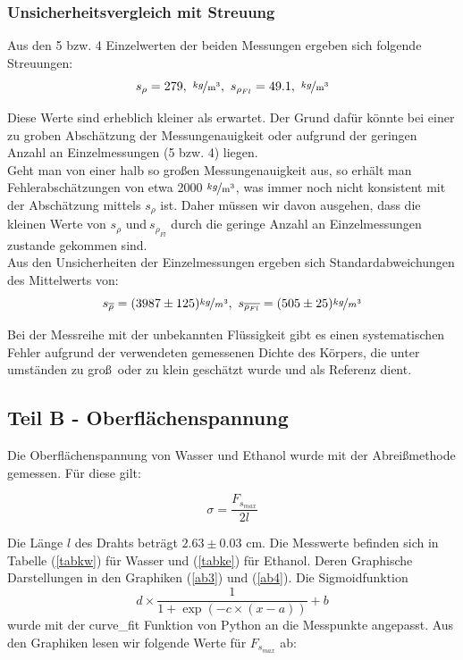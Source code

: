 \documentclass[11pt,a4paper]{article}
\begin{document}
\subsubsection{Unsicherheitsvergleich mit Streuung}

Aus den 5 bzw. 4 Einzelwerten der beiden Messungen ergeben sich folgende Streuungen:\\

$$s_\rho=279,\ \mathrm{\nicefrac{kg}{m^3}},\ s_{\rho_{Fl}}=49.1,\ \mathrm{\nicefrac{kg}{m^3}}$$

Diese Werte sind erheblich kleiner als erwartet. Der Grund daf\"ur k\"onnte bei einer zu groben Absch\"atzung der Messungenauigkeit oder aufgrund der geringen Anzahl an Einzelmessungen (5 bzw. 4) liegen.\\

Geht man von einer halb so gro\ss en Messungenauigkeit aus, so erh\"alt man Fehlerabsch\"atzungen von etwa 2000 $\mathrm{\nicefrac{kg}{m^3}}$, was immer noch nicht konsistent mit der Absch\"atzung mittels $s_\rho$ ist. Daher m\"ussen wir davon ausgehen, dass die kleinen Werte von $s_\rho\textrm{ und}\ s_{\rho_{Fl}}$ durch die geringe Anzahl an Einzelmessungen zustande gekommen sind.\\

Aus den Unsicherheiten der Einzelmessungen ergeben sich Standardabweichungen des Mittelwerts von:\\
\[
s_{\overline{\rho}}=(3987\pm125)\nicefrac{kg}{m^3},\ 
s_{\overline{\rho_{Fl}}}=(505\pm25)\nicefrac{kg}{m^3}
\]

Bei der Messreihe mit der unbekannten Fl\"ussigkeit gibt es einen systematischen Fehler aufgrund der verwendeten gemessenen Dichte des K\"orpers, die unter umst\"anden zu gro\ss\ oder zu klein gesch\"atzt wurde und als Referenz dient.

\subsection{Teil B - Oberfl\"achenspannung}

Die Oberfl\"achenspannung von Wasser und Ethanol wurde mit der Abrei\ss methode gemessen. F\"ur diese gilt:

\begin{equation}
\sigma=\frac{F_{s_{max}}}{2l}\label{eqo}
\end{equation}

Die L\"ange $l$ des Drahts betr\"agt $2.63\pm0.03$ cm. Die Messwerte befinden sich in Tabelle (\ref{tabkw}) f\"ur Wasser und (\ref{tabke}) f\"ur Ethanol. Deren Graphische Darstellungen in den Graphiken (\ref{ab3}) und (\ref{ab4}). Die Sigmoidfunktion $$d\times\frac{1}{1+\exp(-c\times(x-a))}+b$$ wurde mit der curve\_fit Funktion von Python an die Messpunkte angepasst. Aus den Graphiken lesen wir folgende Werte f\"ur $F_{s_{max}}$ ab:
\end{document}
